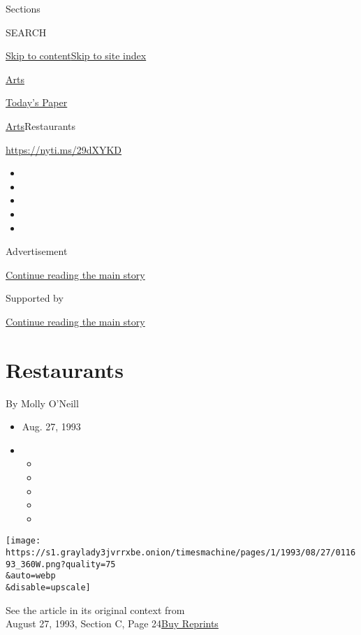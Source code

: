 Sections

SEARCH

\protect\hyperlink{site-content}{Skip to
content}\protect\hyperlink{site-index}{Skip to site index}

\href{https://www.nytimes3xbfgragh.onion/section/arts}{Arts}

\href{https://myaccount.nytimes3xbfgragh.onion/auth/login?response_type=cookie\&client_id=vi}{}

\href{https://www.nytimes3xbfgragh.onion/section/todayspaper}{Today's
Paper}

\href{/section/arts}{Arts}\textbar{}Restaurants

\url{https://nyti.ms/29dXYKD}

\begin{itemize}
\item
\item
\item
\item
\item
\end{itemize}

Advertisement

\protect\hyperlink{after-top}{Continue reading the main story}

Supported by

\protect\hyperlink{after-sponsor}{Continue reading the main story}

\hypertarget{restaurants}{%
\section{Restaurants}\label{restaurants}}

By Molly O'Neill

\begin{itemize}
\item
  Aug. 27, 1993
\item
  \begin{itemize}
  \item
  \item
  \item
  \item
  \item
  \end{itemize}
\end{itemize}

\texttt{[image: https://s1.graylady3jvrrxbe.onion/timesmachine/pages/1/1993/08/27/011693\_360W.png?quality=75\\\&auto=webp\\\&disable=upscale]}

See the article in its original context from\\
August 27, 1993, Section C, Page
24\href{https://store.nytimes3xbfgragh.onion/collections/new-york-times-page-reprints?utm_source=nytimes\&utm_medium=article-page\&utm_campaign=reprints}{Buy
Reprints}

